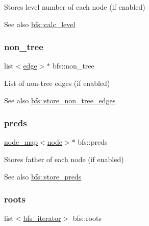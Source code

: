 Stores level number of each node (if enabled) 

\begin{DoxySeeAlso}{See also}
\mbox{\hyperlink{classbfs_a491515da4eb8efca0be4fef0df350a8e}{bfs\+::calc\+\_\+level}} 
\end{DoxySeeAlso}
\mbox{\label{classbfs_aa6783e3e2ac4235403b37df3ee3ee968}} 
\subsubsection{\texorpdfstring{non\+\_\+tree}{non\_tree}}
{\footnotesize\ttfamily list$<$\mbox{\hyperlink{classedge}{edge}}$>$$\ast$ bfs\+::non\+\_\+tree\hspace{0.3cm}{\ttfamily [protected]}}



List of non-\/tree edges (if enabled) 

\begin{DoxySeeAlso}{See also}
\mbox{\hyperlink{classbfs_a7de47b820fb9532f497660f767c9457f}{bfs\+::store\+\_\+non\+\_\+tree\+\_\+edges}} 
\end{DoxySeeAlso}
\mbox{\label{classbfs_a3bac5ed333bb78a30a67099c3b94aa0c}} 
\subsubsection{\texorpdfstring{preds}{preds}}
{\footnotesize\ttfamily \mbox{\hyperlink{classnode__map}{node\+\_\+map}}$<$\mbox{\hyperlink{classnode}{node}}$>$$\ast$ bfs\+::preds\hspace{0.3cm}{\ttfamily [protected]}}



Stores father of each node (if enabled) 

\begin{DoxySeeAlso}{See also}
\mbox{\hyperlink{classbfs_a8c7ce0ea2cd8e1932d1da5693d90cf61}{bfs\+::store\+\_\+preds}} 
\end{DoxySeeAlso}
\mbox{\label{classbfs_a79d19028002766f7992fe94689217f99}} 
\subsubsection{\texorpdfstring{roots}{roots}}
{\footnotesize\ttfamily list$<$\mbox{\hyperlink{classbfs_acafce54954100cc7bc9f80eb318a7bee}{bfs\+\_\+iterator}}$>$ bfs\+::roots\hspace{0.3cm}{\ttfamily [protected]}}



